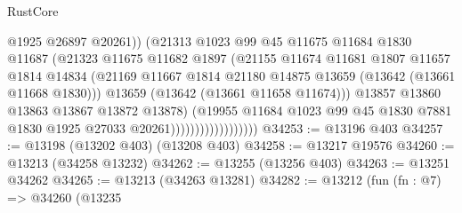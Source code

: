 \begin{lexlean}{RustCore}
\begin{coremodule}
                                        @1925
                                        @26897
                                        @20261))
                                    (@21313
                                      @1023
                                      @99
                                      @45
                                      @11675
                                      @11684
                                      @1830
                                      @11687
                                      (@21323
                                        @11675
                                        @11682
                                        @1897
                                        (@21155
                                          @11674
                                          @11681
                                          @1807
                                          @11657
                                          @1814
                                          @14834
                                          (@21169
                                            @11667
                                            @1814
                                            @21180
                                            @14875
                                            @13659
                                            (@13642 (@13661 @11668 @1830)))
                                          @13659
                                          (@13642 (@13661 @11658 @11674)))
                                        @13857
                                        @13860
                                        @13863
                                        @13867
                                        @13872
                                        @13878)
                                      (@19955
                                        @11684
                                        @1023
                                        @99
                                        @45
                                        @1830
                                        @7881
                                        @1830
                                        @1925
                                        @27033
                                        @20261))))))))))))))))))
@34253 := @13196 @403
@34257 := @13198 (@13202 @403) (@13208 @403)
@34258 := @13217 @19576
@34260 := @13213 (@34258 @13232)
@34262 := @13255 (@13256 @403)
@34263 := @13251 @34262
@34265 := @13213 (@34263 @13281)
@34282 := @13212
    (fun (fn : @7) =>
    @34260
      (@13235

\end{coremodule}
\end{lexlean}
